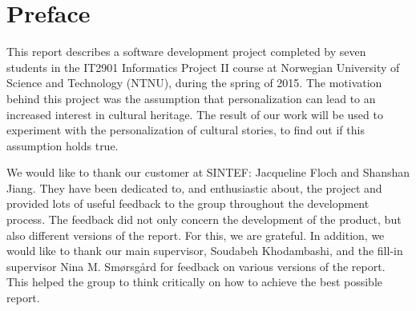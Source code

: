 \section*{\Huge Preface}


\noindent 

This report describes a software development project completed by seven students in the IT2901 Informatics Project II course at Norwegian University of Science and Technology (NTNU), during the spring of 2015. The motivation behind this project was the assumption that personalization can lead to an increased interest in cultural heritage. The result of our work will be used to experiment with the personalization of cultural stories, to find out if this assumption holds true.\newline

We would like to thank our customer at SINTEF: Jacqueline Floch and Shanshan Jiang. They have been dedicated to, and enthusiastic about, the project and provided lots of useful feedback to the group throughout the development process. The feedback did not only concern the development of the product, but also different versions of the report. For this, we are grateful. In addition, we would like to thank our main supervisor, Soudabeh Khodambashi, and the fill-in supervisor Nina M. Smørsgård for feedback on various versions of the report. This helped the group to think critically on how to achieve the best possible report. 

\cleardoublepage